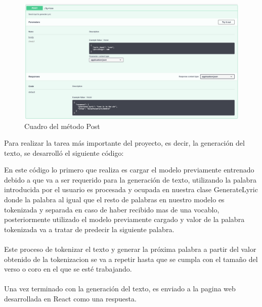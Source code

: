 \documentclass[12pt, a4paper, titlepage]{report}
\begin{document}
\begin{figure}[H]
	\includegraphics[width=13.5cm]{./imagenes/Desarrollo/BackEnd/Post.png}
	\centering 
	\caption{Cuadro del método Post}
\end{figure}
Para realizar la tarea más importante del proyecto, es decir, la generación del texto, se desarrolló el siguiente código:
\begin{center}
	
\end{center}
En este código lo primero que realiza es cargar el modelo previamente entrenado debido a que va a ser requerido para la generación de texto, utilizando la palabra introducida por el usuario es procesada y ocupada en nuestra clase GenerateLyric donde la palabra al igual que el resto de palabras en nuestro modelo es tokenizada y separada en caso de haber recibido mas de una vocablo, posteriormente utilizado el modelo previamente cargado y valor de la palabra tokenizada va a tratar de predecir la siguiente palabra.\\\\
Este proceso de tokenizar el texto y generar la próxima palabra a partir del valor obtenido de la tokenizacion se va a repetir hasta que se cumpla con el tamaño del verso o coro en el que se esté trabajando.\\\\
Una vez terminado con la generación del texto, es enviado a la pagina web desarrollada en React como una respuesta.

\newpage
\end{document}

